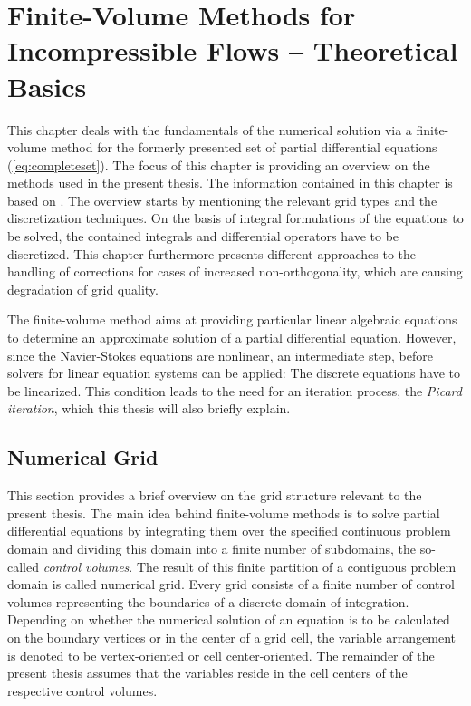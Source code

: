 \chapter{Finite-Volume Methods for Incompressible Flows -- Theoretical Basics}
\label{sec:fvm}

This chapter deals with the fundamentals of the numerical solution via a finite-volume method for the formerly presented set of partial differential equations (\ref{eq:completeset}). The focus of this chapter is providing an overview on the methods used in the present thesis. The information contained in this chapter is based on \cite{ferziger02,jasak96,schaefer99,muzaferja}. The overview starts by mentioning the relevant grid types and the discretization techniques. On the basis of integral formulations of the equations to be solved, the contained integrals and differential operators have to be discretized. This chapter furthermore presents different approaches to the handling of corrections for cases of increased non-orthogonality, which are causing degradation of grid quality.
  
The finite-volume method aims at providing particular linear algebraic equations to determine an approximate solution of a partial differential equation. However, since the Navier-Stokes equations are nonlinear, an intermediate step, before solvers for linear equation systems can be applied: The discrete equations have to be linearized. This condition leads to the need for an iteration process, the \emph{Picard iteration}, which this thesis will also briefly explain. 
      
\section{Numerical Grid}

This section provides a brief overview on the grid structure relevant to the present thesis. The main idea behind finite-volume methods is to solve partial differential equations by integrating them over the specified continuous problem domain and dividing this domain into a finite number of subdomains, the so-called \emph{control volumes}. The result of this finite partition of a contiguous problem domain is called numerical grid. Every grid consists of a finite number of control volumes representing the boundaries of a discrete domain of integration. Depending on whether the numerical solution of an equation is to be calculated on the boundary vertices or in the center of a grid cell, the variable arrangement is denoted to be vertex-oriented or cell center-oriented. The remainder of the present thesis assumes that the variables reside in the cell centers of the respective control volumes.

